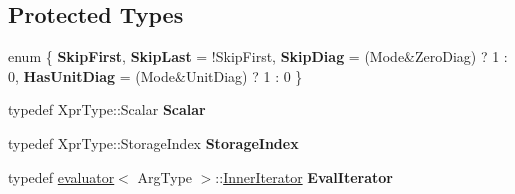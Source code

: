 \subsection*{Protected Types}
\begin{DoxyCompactItemize}
\item 
\mbox{\label{struct_eigen_1_1internal_1_1unary__evaluator_3_01_triangular_view_3_01_arg_type_00_01_mode_01_4_00_01_iterator_based_01_4_a576f9babf189ba4d9580dd291183f96f}} 
enum \{ {\bfseries Skip\+First}, 
{\bfseries Skip\+Last} = !\+Skip\+First, 
{\bfseries Skip\+Diag} = (Mode\&Zero\+Diag) ? 1 \+: 0, 
{\bfseries Has\+Unit\+Diag} = (Mode\&Unit\+Diag) ? 1 \+: 0
 \}
\item 
\mbox{\label{struct_eigen_1_1internal_1_1unary__evaluator_3_01_triangular_view_3_01_arg_type_00_01_mode_01_4_00_01_iterator_based_01_4_a713f28b1d64bce3f47829cfb4bf71a96}} 
typedef Xpr\+Type\+::\+Scalar {\bfseries Scalar}
\item 
\mbox{\label{struct_eigen_1_1internal_1_1unary__evaluator_3_01_triangular_view_3_01_arg_type_00_01_mode_01_4_00_01_iterator_based_01_4_a1baafee270c90bde159d8917c7c283bc}} 
typedef Xpr\+Type\+::\+Storage\+Index {\bfseries Storage\+Index}
\item 
\mbox{\label{struct_eigen_1_1internal_1_1unary__evaluator_3_01_triangular_view_3_01_arg_type_00_01_mode_01_4_00_01_iterator_based_01_4_ad651f2c4a4dcde19e090946de7bfe979}} 
typedef \mbox{\hyperlink{struct_eigen_1_1internal_1_1evaluator}{evaluator}}$<$ Arg\+Type $>$\+::\mbox{\hyperlink{class_eigen_1_1_inner_iterator}{Inner\+Iterator}} {\bfseries Eval\+Iterator}
\end{DoxyCompactItemize}
